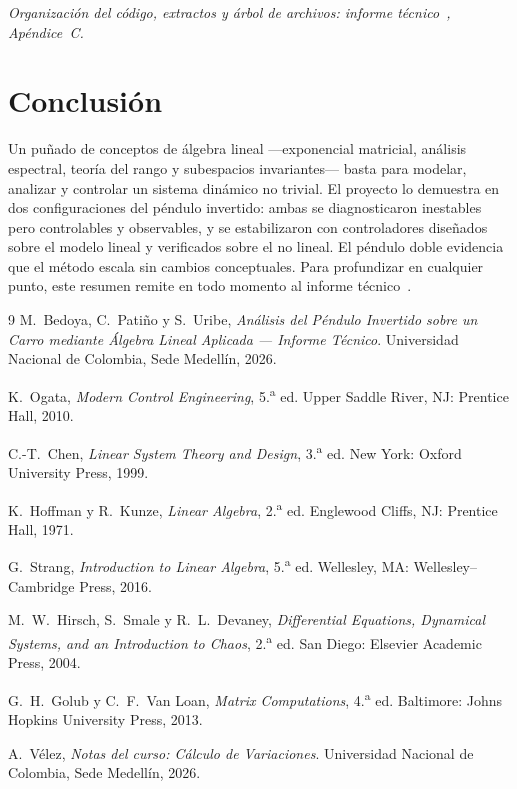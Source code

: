 \documentclass[11pt,letterpaper]{article}
\begin{document}
\noindent\emph{Organización del código, extractos y árbol de archivos:
informe técnico~\cite{tecnico}, Apéndice~C.}

\section{Conclusión}

Un puñado de conceptos de álgebra lineal ---exponencial matricial, análisis
espectral, teoría del rango y subespacios invariantes--- basta para modelar,
analizar y controlar un sistema dinámico no trivial. El proyecto lo demuestra en
dos configuraciones del péndulo invertido: ambas se diagnosticaron inestables
pero controlables y observables, y se estabilizaron con controladores diseñados
sobre el modelo lineal y verificados sobre el no lineal. El péndulo doble
evidencia que el método escala sin cambios conceptuales. Para profundizar en
cualquier punto, este resumen remite en todo momento al informe
técnico~\cite{tecnico}.

\begin{thebibliography}{9}
\small
{}
M.~Bedoya, C.~Patiño y S.~Uribe, \emph{Análisis del Péndulo Invertido sobre un
Carro mediante Álgebra Lineal Aplicada --- Informe Técnico}. Universidad Nacional
de Colombia, Sede Medellín, 2026. 

K.~Ogata, \emph{Modern Control Engineering}, 5.\textsuperscript{a} ed.
Upper Saddle River, NJ: Prentice Hall, 2010.

C.-T.~Chen, \emph{Linear System Theory and Design}, 3.\textsuperscript{a} ed.
New York: Oxford University Press, 1999.

K.~Hoffman y R.~Kunze, \emph{Linear Algebra}, 2.\textsuperscript{a} ed.
Englewood Cliffs, NJ: Prentice Hall, 1971.

G.~Strang, \emph{Introduction to Linear Algebra}, 5.\textsuperscript{a} ed.
Wellesley, MA: Wellesley--Cambridge Press, 2016.

M.~W.~Hirsch, S.~Smale y R.~L.~Devaney, \emph{Differential Equations,
Dynamical Systems, and an Introduction to Chaos}, 2.\textsuperscript{a} ed.
San Diego: Elsevier Academic Press, 2004.

G.~H.~Golub y C.~F.~Van Loan, \emph{Matrix Computations},
4.\textsuperscript{a} ed. Baltimore: Johns Hopkins University Press, 2013.

A.~Vélez, \emph{Notas del curso: Cálculo de Variaciones}. Universidad Nacional de Colombia, Sede Medellín, 2026.

\end{thebibliography}
\end{document}
